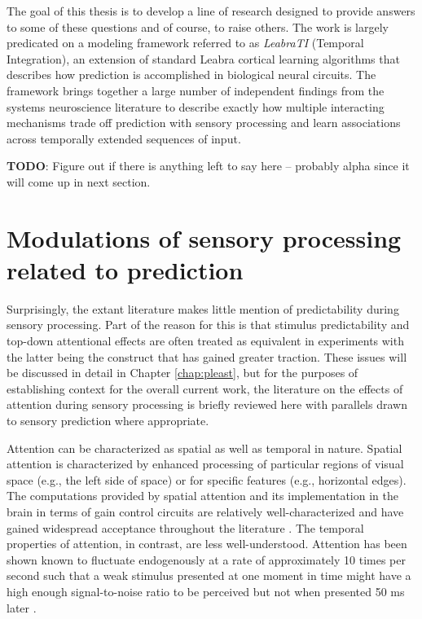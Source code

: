 \documentclass[dwyatte_dissertation.tex]{subfiles}
\begin{document}
{The goal of this thesis is to develop a line of research designed to provide answers to some of these questions and of course, to raise others. The work is largely predicated on a modeling framework referred to as \textit{LeabraTI} (Temporal Integration), an extension of standard Leabra cortical learning algorithms \cite{OReillyMunakata00,OReillyMunakataFrankEtAl12} that describes how prediction is accomplished in biological neural circuits. The framework brings together a large number of independent findings from the systems neuroscience literature to describe exactly how multiple interacting mechanisms trade off prediction with sensory processing and learn associations across temporally extended sequences of input. 


\textbf{TODO}: Figure out if there is anything left to say here -- probably alpha since it will come up in next section.

\section{Modulations of sensory processing related to prediction}
Surprisingly, the extant literature makes little mention of predictability during sensory processing. Part of the reason for this is that stimulus predictability and top-down attentional effects are often treated as equivalent in experiments \cite{SummerfieldEgner09,KokRahnevJeheeEtAl12} with the latter being the construct that has gained greater traction. These issues will be discussed in detail in Chapter \ref{chap:pleast}, but for the purposes of establishing context for the overall current work, the literature on the effects of attention during sensory processing is briefly reviewed here with parallels drawn to sensory prediction where appropriate.

Attention can be characterized as spatial as well as temporal in nature. Spatial attention is characterized by enhanced processing of particular regions of visual space (e.g., the left side of space) or for specific features (e.g., horizontal edges). The computations provided by spatial attention and its implementation in the brain in terms of gain control circuits are relatively well-characterized and have gained widespread acceptance throughout the literature \cite[see][for comprehensive reviews]{DesimoneDuncan95,ReynoldsChelazzi04}. The temporal properties of attention, in contrast, are less well-understood. Attention has been shown known to fluctuate endogenously at a rate of approximately 10 times per second such that a weak stimulus presented at one moment in time might have a high enough signal-to-noise ratio to be perceived but not when presented 50 ms later \cite{VanrullenBuschDrewesEtAl11}.

}
\end{document}
